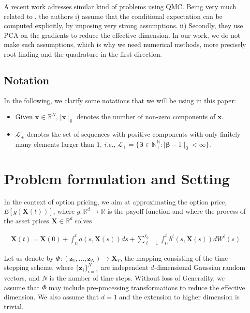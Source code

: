 \documentclass[11pt]{article}
\newcommand{\ie}{\emph{i.e.}}
\newcommand{\rset}{\mathbb{R}}
\newcommand{\nset}{\mathbb{N}}
\begin{document}
A recent work \cite{xiao2018conditional} adresses similar kind of problems using QMC. Being very much related to \cite{bayersmoothing}, the authors i) assume that the conditional expectation can be computed explicitly, by imposing very strong assumptions. ii) Secondly, they  use  PCA on the gradients to reduce the effective dimension. In our work, we do not make such assumptions, which is why we need numerical methods, more precisely root finding and the quadrature in the first direction.
\subsection{Notation}
In the following, we clarify some notations that we will be using in this paper:
\begin{itemize}
	\item Given $\mathbf{x} \in  \rset^N$, $\mid \mathbf{x} \mid_0$  denotes the number of non-zero components of $\mathbf{x}$.
	\item $\mathcal{L}_+$ denotes the set of sequences with positive components with only finitely many elements larger than $1$, \ie,  $\mathcal{L}_+=\{\boldsymbol{\beta}\in \nset_+^\nset: \mid \boldsymbol{\beta}-1\mid_0<\infty  \}$.
\end{itemize}



\section{Problem formulation and Setting}\label{sec:General setting}


In the context of option pricing, we aim at approximating the option price, $E[g(\mathbf{X}(t))]$,  where $g:\mathbb{R}^d  \rightarrow \mathbb{R}$ is the payoff function  and where  the process of the asset prices $\mathbf{X} \in \mathbb{R}^d$ solves 

\begin{align}
	\mathbf{X}(t)=\mathbf{X}(0)+ \int_{0}^{t} a(s,\mathbf{X}(s)) ds + \sum_{\ell=1}^{\ell_0} \int_{0}^{t} b^{\ell}(s,\mathbf{X}(s)) dW^{\ell}(s)
\end{align}

Let us denote  by $\Phi: (\mathbf{z}_1,\dots,\mathbf{z}_N) \rightarrow \mathbf{X}_T$, the mapping consisting of the time-stepping scheme, where $\{\mathbf{z}_i\}_{i=1}^N$ are independent $d$-dimensional Gaussian random vectors, and $N$ is the number of time steps. Without loss of Generality, we assume that $\Phi$ may include pre-processing transformations to reduce the effective dimension. We also assume that $d=1$ and the extension to higher dimension is trivial.
\end{document}
